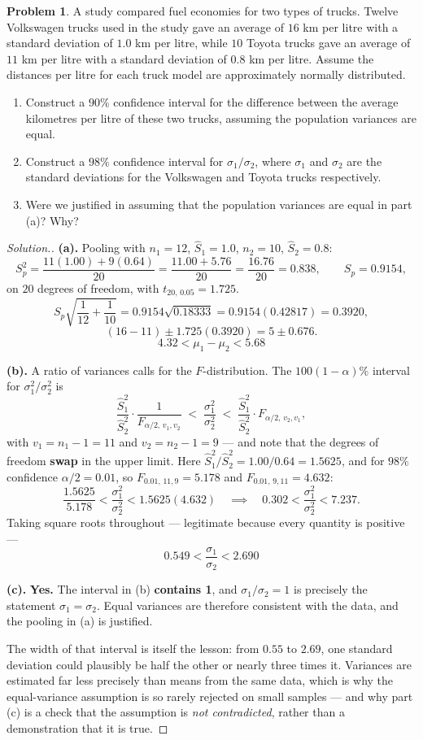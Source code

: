 \documentclass[11pt,a4paper]{article}
\theoremstyle{definition}
\newtheorem{problemx}{Problem}[section]
\newenvironment{problem}{\begin{problemx}}{\end{problemx}}
\newenvironment{solution}
  {\renewcommand{\qedsymbol}{}\begin{proof}[\textit{Solution}.]}
  {\end{proof}}
\begin{document}
\begin{problem}
A study compared fuel economies for two types of trucks. Twelve Volkswagen trucks used in
the study gave an average of $16$ km per litre with a standard deviation of $1.0$ km per
litre, while $10$ Toyota trucks gave an average of $11$ km per litre with a standard
deviation of $0.8$ km per litre. Assume the distances per litre for each truck model are
approximately normally distributed.
\begin{enumerate}
\item[(a).] Construct a $90\%$ confidence interval for the difference between the average
kilometres per litre of these two trucks, assuming the population variances are equal.
\item[(b).] Construct a $98\%$ confidence interval for $\sigma_1/\sigma_2$, where
$\sigma_1$ and $\sigma_2$ are the standard deviations for the Volkswagen and Toyota trucks
respectively.
\item[(c).] Were we justified in assuming that the population variances are equal in
part (a)? Why?
\end{enumerate}
\end{problem}

\begin{solution}
\textbf{(a).} Pooling with $n_1=12$, $\hat{S}_1=1.0$, $n_2=10$, $\hat{S}_2=0.8$:
\[S_p^2=\frac{11(1.00)+9(0.64)}{20}=\frac{11.00+5.76}{20}=\frac{16.76}{20}=0.838,
\qquad S_p=0.9154,\]
on $20$ degrees of freedom, with $t_{20,\,0.05}=1.725$.
\[S_p\sqrt{\frac{1}{12}+\frac{1}{10}}=0.9154\sqrt{0.18333}=0.9154(0.42817)=0.3920,\]
\[(16-11)\pm 1.725(0.3920)=5\pm 0.676.\]
\[4.32<\mu_1-\mu_2<5.68\]

\textbf{(b).} A ratio of variances calls for the $F$-distribution. The $100(1-\alpha)\%$
interval for $\sigma_1^2/\sigma_2^2$ is
\[\frac{\hat{S}_1^2}{\hat{S}_2^2}\cdot\frac{1}{F_{\alpha/2,\,v_1,v_2}}
\;<\;\frac{\sigma_1^2}{\sigma_2^2}\;<\;
\frac{\hat{S}_1^2}{\hat{S}_2^2}\cdot F_{\alpha/2,\,v_2,v_1},\]
with $v_1=n_1-1=11$ and $v_2=n_2-1=9$ --- and note that the degrees of freedom
\textbf{swap} in the upper limit. Here $\hat{S}_1^2/\hat{S}_2^2=1.00/0.64=1.5625$, and for
$98\%$ confidence $\alpha/2=0.01$, so $F_{0.01,\,11,9}=5.178$ and $F_{0.01,\,9,11}=4.632$:
\[\frac{1.5625}{5.178}<\frac{\sigma_1^2}{\sigma_2^2}<1.5625(4.632)
\quad\implies\quad 0.302<\frac{\sigma_1^2}{\sigma_2^2}<7.237.\]
Taking square roots throughout --- legitimate because every quantity is positive ---
\[0.549<\frac{\sigma_1}{\sigma_2}<2.690\]

\textbf{(c).} \textbf{Yes.} The interval in (b) \textbf{contains 1}, and
$\sigma_1/\sigma_2=1$ is precisely the statement $\sigma_1=\sigma_2$. Equal variances are
therefore consistent with the data, and the pooling in (a) is justified.

The width of that interval is itself the lesson: from $0.55$ to $2.69$, one standard
deviation could plausibly be half the other or nearly three times it. Variances are
estimated far less precisely than means from the same data, which is why the equal-variance
assumption is so rarely rejected on small samples --- and why part (c) is a check that the
assumption is \emph{not contradicted}, rather than a demonstration that it is true.
\end{solution}
\end{document}
